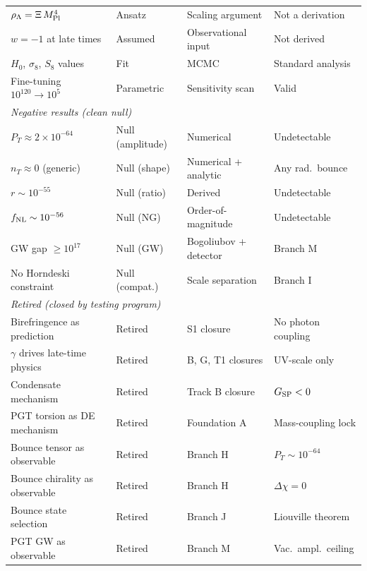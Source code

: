 \documentclass[aps,prd,twocolumn,superscriptaddress,showpacs,preprintnumbers,
  nofootinbib,longbibliography,floatfix]{revtex4-2}
\newcommand{\MPl}{M_{\rm Pl}}
\newcommand{\BI}{\gamma}
\newcommand{\Gsp}{G_{\rm SP}}
\begin{document}
\begin{table}[t]
\begin{ruledtabular}
\begin{tabular}{llll}
$\rho_\Lambda = \Xi\,\MPl^4$ & Ansatz & Scaling argument & Not a derivation \\
$w = -1$ at late times & Assumed & Observational input & Not derived \\
$H_0$, $\sigma_8$, $S_8$ values & Fit & MCMC & Standard analysis \\
Fine-tuning $10^{120} \to 10^5$ & Parametric & Sensitivity scan & Valid \\
\hline
\multicolumn{4}{l}{\textit{Negative results (clean null)}} \\
$P_T \approx 2\times 10^{-64}$ & Null (amplitude) & Numerical & Undetectable \\
$n_T \approx 0$ (generic) & Null (shape) & Numerical + analytic & Any rad.\ bounce \\
$r \sim 10^{-55}$ & Null (ratio) & Derived & Undetectable \\
$f_{\rm NL} \sim 10^{-56}$ & Null (NG) & Order-of-magnitude & Undetectable \\
GW gap $\geq 10^{17}$ & Null (GW) & Bogoliubov + detector & Branch M \\
No Horndeski constraint & Null (compat.) & Scale separation & Branch I \\
\hline
\multicolumn{4}{l}{\textit{Retired (closed by testing program)}} \\
Birefringence as prediction & Retired & S1 closure & No photon coupling \\
$\BI$ drives late-time physics & Retired & B, G, T1 closures & UV-scale only \\
Condensate mechanism & Retired & Track B closure & $\Gsp < 0$ \\
PGT torsion as DE mechanism & Retired & Foundation A & Mass-coupling lock \\
Bounce tensor as observable & Retired & Branch H & $P_T \sim 10^{-64}$ \\
Bounce chirality as observable & Retired & Branch H & $\Delta\chi = 0$ \\
Bounce state selection & Retired & Branch J & Liouville theorem \\
PGT GW as observable & Retired & Branch M & Vac.\ ampl.\ ceiling \\
\end{tabular}
\end{ruledtabular}
\end{table}


\end{document}
